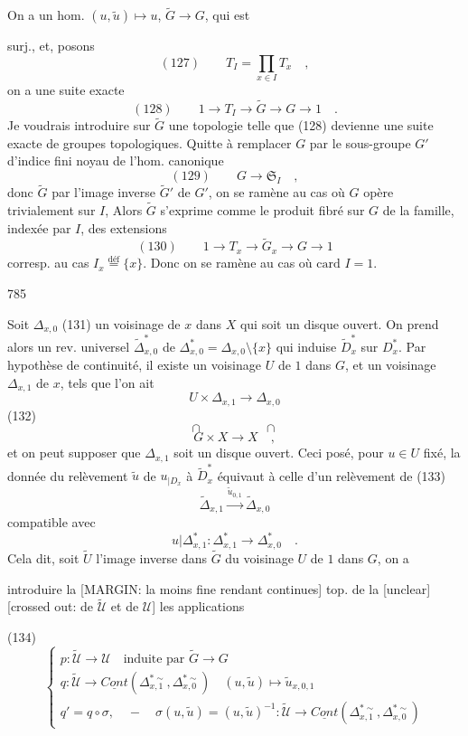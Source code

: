 On a un hom. $(u, \tilde{u}) \mapsto u$, $\tilde{G} \to G$, qui est

\newpage


surj., et, posons
$$ (127) \quad\quad T_I = \prod_{x \in I} T_x \quad , $$
on a une suite exacte
$$ (128) \quad\quad 1 \to T_I \to \tilde{G} \to G \to 1 \quad . $$
Je voudrais introduire sur $\tilde{G}$ une
topologie telle que (128) devienne une
suite exacte de groupes topologiques.
Quitte à remplacer $G$ par le sous-groupe $G'$
d'indice fini noyau de l'hom.
canonique
$$ (129) \quad\quad G \to \mathfrak{S}_I \quad , $$
donc $\tilde{G}$ par l'image inverse $\tilde{G}'$ de $G'$,
on se ramène au cas où $G$ opère
trivialement sur $I$, Alors $\tilde{G}$ s'exprime
comme le produit fibré sur
$G$ de la famille, indexée par $I$,
des extensions
$$ (130) \quad\quad 1 \to T_x \to \tilde{G}_x \to G \to 1 $$
corresp. au cas $I_x \overset{\text{déf}}{=} \{x\}$. Donc
on se ramène au cas où $\text{card } I = 1$.

\newpage


785

Soit $\Delta_{x,0}$
(131)
un voisinage de $x$ dans $X$
qui soit un disque ouvert. On prend alors
un rev. universel $\tilde{\Delta}_{x,0}^*$ de $\Delta_{x,0}^* = \Delta_{x,0} \setminus \{x\}$
qui induise $\tilde{D}_x^*$ sur $D_x^*$. Par hypothèse
de continuité, il existe un voisinage
$U$ de $1$ dans $G$, et un voisinage $\Delta_{x,1}$ de
$x$, tels que l'on ait
$$U \times \Delta_{x,1} \longrightarrow \Delta_{x,0}$$
(132) $$\cap \quad \quad \quad \quad \quad \cap$$
$$G \times X \longrightarrow X \quad ,$$
et on peut supposer que $\Delta_{x,1}$ soit un
disque ouvert. Ceci posé, pour $u \in U$
fixé, la donnée du relèvement $\tilde{u}$ de $u_{|D_x}$
à $\tilde{D}_x^*$ équivaut à celle d'un relèvement
de
(133) $$\tilde{\Delta}_{x,1} \stackrel{\tilde{u}_{0,1}}{\longrightarrow} \tilde{\Delta}_{x,0}$$
compatible avec
$$u | \Delta_{x,1}^* : \Delta_{x,1}^* \longrightarrow \Delta_{x,0}^* \quad .$$
Cela dit, soit $\tilde{U}$ l'image inverse dans
$\tilde{G}$ du voisinage $U$ de $1$ dans $G$, on a

\newpage


introduire la [MARGIN: la moins fine rendant continues] top. de la [unclear]
[crossed out: de $\tilde{\mathcal{U}}$ et de $\mathcal{U}$]
les applications

(134)
$$
\begin{cases}
p : \tilde{\mathcal{U}} \longrightarrow \mathcal{U} \quad \text{induite par } \tilde{G} \to G \\
q : \tilde{\mathcal{U}} \longrightarrow \underline{Cont}(\Delta_{x,1}^{*\sim}, \Delta_{x,0}^{*\sim}) \quad (u,\tilde{u}) \longmapsto \tilde{u}_{x,0,1} \\
q' = q \circ \sigma, \quad - \quad \sigma(u,\tilde{u}) = (u,\tilde{u})^{-1} : \tilde{\mathcal{U}} \to \underline{Cont}(\Delta_{x,1}^{*\sim}, \Delta_{x,0}^{*\sim})
\end{cases}
$$


